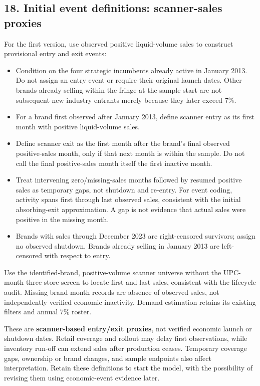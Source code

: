 \documentclass[10pt,]{article}
\providecommand{\tightlist}{%
  \setlength{\itemsep}{0pt}\setlength{\parskip}{0pt}}
\begin{document}
\subsection{18. Initial event definitions: scanner-sales
proxies}\label{initial-event-definitions-scanner-sales-proxies}

For the first version, use observed positive liquid-volume sales to
construct provisional entry and exit events:

\begin{itemize}
\tightlist
\item
  Condition on the four strategic incumbents already active in January
  2013. Do not assign an entry event or require their original launch
  dates. Other brands already selling within the fringe at the sample
  start are not subsequent new industry entrants merely because they
  later exceed 7\%.
\item
  For a brand first observed after January 2013, define scanner entry as
  its first month with positive liquid-volume sales.
\item
  Define scanner exit as the first month after the brand's final
  observed positive-sales month, only if that next month is within the
  sample. Do not call the final positive-sales month itself the first
  inactive month.
\item
  Treat intervening zero/missing-sales months followed by resumed
  positive sales as temporary gaps, not shutdown and re-entry. For event
  coding, activity spans first through last observed sales, consistent
  with the initial absorbing-exit approximation. A gap is not evidence
  that actual sales were positive in the missing month.
\item
  Brands with sales through December 2023 are right-censored survivors;
  assign no observed shutdown. Brands already selling in January 2013
  are left-censored with respect to entry.
\end{itemize}

Use the identified-brand, positive-volume scanner universe without the
UPC-month three-store screen to locate first and last sales, consistent
with the lifecycle audit. Missing brand-month records are absence of
observed sales, not independently verified economic inactivity. Demand
estimation retains its existing filters and annual 7\% roster.

These are \textbf{scanner-based entry/exit proxies}, not verified
economic launch or shutdown dates. Retail coverage and rollout may delay
first observations, while inventory run-off can extend sales after
production ceases. Temporary coverage gaps, ownership or brand changes,
and sample endpoints also affect interpretation. Retain these
definitions to start the model, with the possibility of revising them
using economic-event evidence later.
\end{document}
